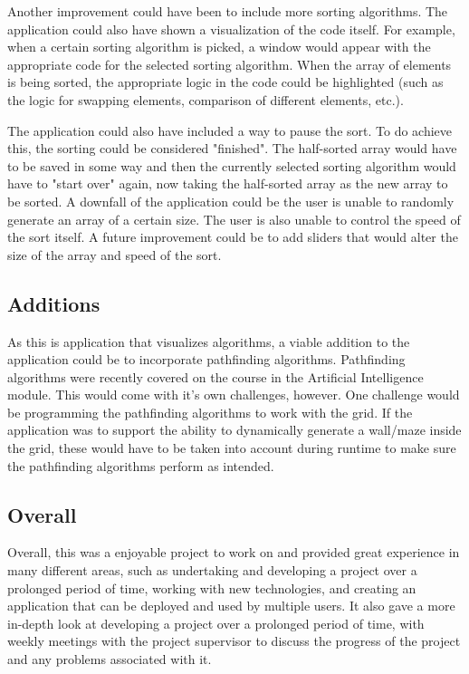 Another improvement could have been to include more sorting algorithms. The application could also have shown a visualization of the code itself. For example, when a certain sorting algorithm is picked, a window would appear with the appropriate code for the selected sorting algorithm. When the array of elements is being sorted, the appropriate logic in the code could be highlighted (such as the logic for swapping elements, comparison of different elements, etc.).
\bigskip

The application could also have included a way to pause the sort. To do achieve this, the sorting could be considered "finished". The half-sorted array would have to be saved in some way and then the currently selected sorting algorithm would have to "start over" again, now taking the half-sorted array as the new array to be sorted. 
A downfall of the application could be the user is unable to randomly generate an array of a certain size. The user is also unable to control the speed of the sort itself. A future improvement could be to add sliders that would alter the size of the array and speed of the sort.

\subsection{Additions}
As this is application that visualizes algorithms, a viable addition to the application could be to incorporate pathfinding algorithms. Pathfinding algorithms were recently covered on the course in the Artificial Intelligence module. This would come with it's own challenges, however. One challenge would be programming the pathfinding algorithms to work with the grid. If the application was to support the ability to dynamically generate a wall/maze inside the grid, these would have to be taken into account during runtime to make sure the pathfinding algorithms perform as intended. 

\subsection{Overall}
Overall, this was a enjoyable project to work on and provided great experience in many different areas, such as undertaking and developing a project over a prolonged period of time, working with new technologies, and creating an application that can be deployed and used by multiple users. It also gave a more in-depth look at developing a project over a prolonged period of time, with weekly meetings with the project supervisor to discuss the progress of the project and any problems associated with it.